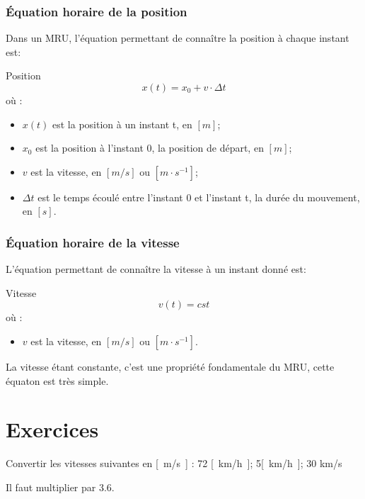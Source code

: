 \subsubsection{Équation horaire de la position}
Dans un MRU, l'équation permettant de connaître la position à chaque instant est:
\begin{mytheo*}{Position}
    \begin{equation}
        x(t)=x_0+v \cdot \Delta t
    \end{equation}
    où :
    \begin{itemize}[label=\textbullet]
        \item \(x(t)\) est la position à un instant t, en \(\unit{[m]}\);
        \item \(x_0\) est la position à l'instant 0, la position de départ, en \(\unit{[m]}\);
        \item \(v\) est la vitesse, en \(\unit{[m/s]}\) ou \(\unit{[m \cdot s^{-1}]}\);
        \item \(\Delta t\) est le temps écoulé entre l'instant 0 et l'instant t, la durée du mouvement, en \([s]\).
    \end{itemize}
\end{mytheo*}

\subsubsection{Équation horaire de la vitesse}
L'équation permettant de connaître la vitesse à un instant donné est:
\begin{mytheo*}{Vitesse}
    \begin{equation}
        v(t)=cst
    \end{equation}
    où :
    \begin{itemize}[label= \textbullet]
        \item \(v\) est la vitesse, en \(\unit{[m/s]}\) ou \(\unit{[m \cdot s^{-1}]}\).
    \end{itemize}
\end{mytheo*}
La vitesse étant constante, c'est une propriété fondamentale du MRU, cette équaton est très simple.

\newpage

\section{Exercices}
\begin{exercise}
    Convertir les vitesses suivantes en \unit{[m/s]} : 72 \unit{[km/h]}; 5\unit{[km/h]}; 30 km/s
\end{exercise}
\begin{solution}
    Il faut multiplier par 3.6.
\end{solution}

